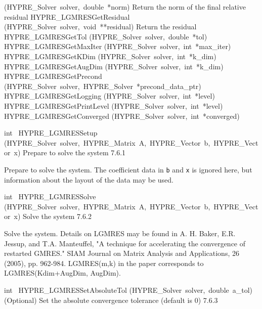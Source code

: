 \documentclass{article}
\begin{document}
\begin{cxxentry}
\begin{cxxentry}
\begin{cxxnames}
        {(HYPRE\_Solver\ solver,\ double\ *norm)}
        {
Return the norm of the final relative residual}
        {}
\label{cxx.7.6.12}
        {HYPRE\_LGMRESGetResidual}
        {(HYPRE\_Solver\ solver,\ void\ **residual)}
        {
Return the residual}
        {}
\label{cxx.7.6.13}
        {HYPRE\_LGMRESGetTol}
        {(HYPRE\_Solver\ solver,\ double\ *tol)}
        {}
        {}
\label{cxx.7.6.14}
        {HYPRE\_LGMRESGetMaxIter}
        {(HYPRE\_Solver\ solver,\ int\ *max\_iter)}
        {}
        {}
\label{cxx.7.6.15}
        {HYPRE\_LGMRESGetKDim}
        {(HYPRE\_Solver\ solver,\ int\ *k\_dim)}
        {}
        {}
\label{cxx.7.6.16}
        {HYPRE\_LGMRESGetAugDim}
        {(HYPRE\_Solver\ solver,\ int\ *k\_dim)}
        {}
        {}
\label{cxx.7.6.17}
        {HYPRE\_LGMRESGetPrecond}
        {(HYPRE\_Solver\ solver,\ HYPRE\_Solver\ *precond\_data\_ptr)}
        {}
        {}
\label{cxx.7.6.18}
        {HYPRE\_LGMRESGetLogging}
        {(HYPRE\_Solver\ solver,\ int\ *level)}
        {}
        {}
\label{cxx.7.6.19}
        {HYPRE\_LGMRESGetPrintLevel}
        {(HYPRE\_Solver\ solver,\ int\ *level)}
        {}
        {}
\label{cxx.7.6.20}
        {HYPRE\_LGMRESGetConverged}
        {(HYPRE\_Solver\ solver,\ int\ *converged)}
        {}
        {}
\label{cxx.7.6.21}
\end{cxxnames}
\begin{cxxfunction}
{int\ }
        {HYPRE\_LGMRESSetup}
        {(HYPRE\_Solver\ solver,\ HYPRE\_Matrix\ A,\ HYPRE\_Vector\ b,\ HYPRE\_Vector\ x)}
        {
Prepare to solve the system}
        {7.6.1}
\begin{cxxdoc}

Prepare to solve the system.  The coefficient data in {\tt b} and {\tt x} is
ignored here, but information about the layout of the data may be used.
\end{cxxdoc}
\end{cxxfunction}
\begin{cxxfunction}
{int\ }
        {HYPRE\_LGMRESSolve}
        {(HYPRE\_Solver\ solver,\ HYPRE\_Matrix\ A,\ HYPRE\_Vector\ b,\ HYPRE\_Vector\ x)}
        {
Solve the system}
        {7.6.2}
\begin{cxxdoc}

Solve the system. Details on LGMRES may be found in A. H. Baker,
E.R. Jessup, and T.A. Manteuffel, "A technique for accelerating the
convergence of restarted GMRES." SIAM Journal on Matrix Analysis and
Applications, 26 (2005), pp. 962-984. LGMRES(m,k) in the paper
corresponds to LGMRES(Kdim+AugDim, AugDim).
\end{cxxdoc}
\end{cxxfunction}
\begin{cxxfunction}
{int\ }
        {HYPRE\_LGMRESSetAbsoluteTol}
        {(HYPRE\_Solver\ solver,\ double\ a\_tol)}
        {
(Optional) Set the absolute convergence tolerance (default is 0)}
        {7.6.3}
\begin{cxxdoc}


\end{cxxdoc}
\end{cxxfunction}
\end{cxxentry}
\end{cxxentry}
\end{document}
